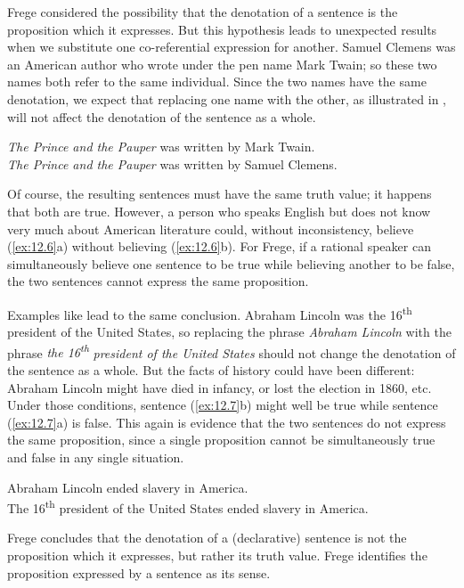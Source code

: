 Frege considered the possibility that the denotation of a sentence is the proposition which it expresses. But this hypothesis leads to unexpected results when we substitute one co-referential expression for another. Samuel Clemens was an American author who wrote under the pen name Mark Twain; so these two names both refer to the same individual. Since the two names have the same denotation, we expect that replacing one name with the other, as illustrated in , will not affect the denotation of the sentence as a whole.


\ea \label{ex:12.6}
\ea \textit{The Prince and the Pauper} was written by Mark Twain.\\
\ex \textit{The Prince and the Pauper} was written by Samuel Clemens.
                       \z
\z


Of course, the resulting sentences must have the same truth value; it happens that both are true. However, a person who speaks English but does not know very much about American literature could, without inconsistency, believe (\ref{ex:12.6}a) without believing (\ref{ex:12.6}b). For Frege, if a rational speaker can simultaneously believe one sentence to be true while believing another to be false, the two sentences cannot express the same proposition.



Examples like  lead to the same conclusion. Abraham Lincoln was the 16\textsuperscript{th} president of the United States, so replacing the phrase \textit{Abraham Lincoln} with the phrase \textit{the 16\textsuperscript{th}} \textit{president of the United States} should not change the denotation of the sentence as a whole. But the facts of history could have been different: Abraham Lincoln might have died in infancy, or lost the election in 1860, etc. Under those conditions, sentence (\ref{ex:12.7}b) might well be true while sentence (\ref{ex:12.7}a) is false. This again is evidence that the two sentences do not express the same proposition, since a single proposition cannot be simultaneously true and false in any single situation.


\ea \label{ex:12.7}
\ea Abraham Lincoln ended slavery in America.\\
\ex The 16\textsuperscript{th} president of the United States ended slavery in America.
                       \z
\z


Frege concludes that the denotation of a (declarative) sentence is not the proposition which it expresses, but rather its truth value. Frege identifies the proposition expressed by a sentence as its sense.



